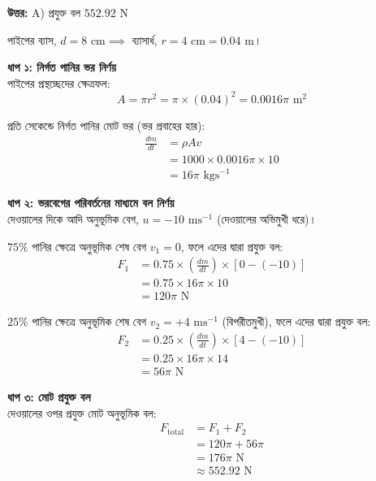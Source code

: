 \documentclass[12pt, a4paper]{article}
\begin{document}
\vspace{0.5em}
\begin{tcolorbox}[answerbox]
    \textbf{\color{success} উত্তর:} A) প্রযুক্ত বল $552.92\text{ N}$
\end{tcolorbox}
\vspace{1em}

\begin{tcolorbox}[solutionbox={সমাধান (Solution)}]
    \noindent
    পাইপের ব্যাস, $d = 8\text{ cm} \implies$ ব্যাসার্ধ, $r = 4\text{ cm} = 0.04\text{ m}$।
    
    \vspace{0.5em}
    \noindent\textbf{ধাপ ১: নির্গত পানির ভর নির্ণয়} \\
    পাইপের প্রস্থচ্ছেদের ক্ষেত্রফল:
    \[ A = \pi r^2 = \pi \times (0.04)^2 = 0.0016\pi\text{ m}^2 \]
    
    প্রতি সেকেন্ডে নির্গত পানির মোট ভর (ভর প্রবাহের হার):
    \begin{align*}
        \frac{dm}{dt} &= \rho A v \\
        &= 1000 \times 0.0016\pi \times 10 \\
        &= 16\pi\text{ kgs}^{-1}
    \end{align*}
    
    \vspace{0.5em}
    \noindent\textbf{ধাপ ২: ভরবেগের পরিবর্তনের মাধ্যমে বল নির্ণয়} \\
    দেওয়ালের দিকে আদি অনুভূমিক বেগ, $u = -10\text{ ms}^{-1}$ (দেওয়ালের অভিমুখী ধরে)।
    
    $75\%$ পানির ক্ষেত্রে অনুভূমিক শেষ বেগ $v_1 = 0$, ফলে এদের দ্বারা প্রযুক্ত বল:
    \begin{align*}
        F_1 &= 0.75 \times \left(\frac{dm}{dt}\right) \times [0 - (-10)] \\
        &= 0.75 \times 16\pi \times 10 \\
        &= 120\pi\text{ N}
    \end{align*}
    
    $25\%$ পানির ক্ষেত্রে অনুভূমিক শেষ বেগ $v_2 = +4\text{ ms}^{-1}$ (বিপরীতমুখী), ফলে এদের দ্বারা প্রযুক্ত বল:
    \begin{align*}
        F_2 &= 0.25 \times \left(\frac{dm}{dt}\right) \times [4 - (-10)] \\
        &= 0.25 \times 16\pi \times 14 \\
        &= 56\pi\text{ N}
    \end{align*}
    
    \vspace{0.5em}
    \noindent\textbf{ধাপ ৩: মোট প্রযুক্ত বল} \\
    দেওয়ালের ওপর প্রযুক্ত মোট অনুভূমিক বল:
    \begin{align*}
        F_{\text{total}} &= F_1 + F_2 \\
        &= 120\pi + 56\pi \\
        &= 176\pi\text{ N} \\
        &\approx \mathbf{552.92}\text{ N}
    \end{align*}
\end{tcolorbox}
\end{document}
